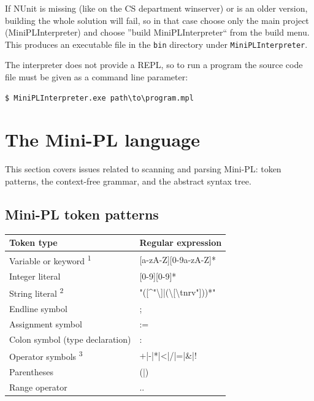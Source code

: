 \documentclass[a4paper,11pt]{article}
\begin{document}
If NUnit is missing (like on the CS department winserver) or is an older version, building the whole solution will fail, so in that case choose only the main project (MiniPLInterpreter) and choose ''build MiniPLInterpreter`` from the build menu. This produces an executable file in the \verb,bin, directory under \verb,MiniPLInterpreter,.

The interpreter does not provide a REPL, so to run a program the source code file must be given as a command line parameter:

\begin{verbatim}
$ MiniPLInterpreter.exe path\to\program.mpl
\end{verbatim}

\newpage
\section{The Mini-PL language}

This section covers issues related to scanning and parsing Mini-PL: token patterns, the context-free grammar, and the abstract syntax tree.

\subsection{Mini-PL token patterns}

\begin{table}[h!]
\begin{tabular}{| l | l |}
    \hline
    Token type & Regular expression \\
    \hline
    Variable or keyword \textsuperscript{1} & [a-zA-Z][0-9a-zA-Z]* \\
    \hline
    Integer literal & [0-9][0-9]* \\
    \hline
    String literal \textsuperscript{2} & "([\^{}"\textbackslash]|(\textbackslash[\textbackslash tnrv"]))*" \\
    \hline
    Endline symbol & ; \\
    \hline
    Assignment symbol & := \\
    \hline
    Colon symbol (type declaration) & : \\
    \hline
    Operator symbols \textsuperscript{3} & +|-|*|<|/|=|\&|! \\
    \hline
    Parentheses & (|) \\
    \hline
    Range operator & .. \\
    \hline
\end{tabular}
\end{table}
\end{document}
